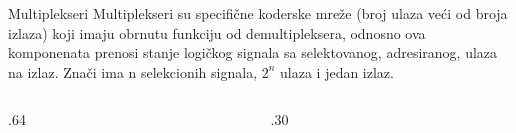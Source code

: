 \begin{frame}[label=03-s013]{Multiplekseri}
\gusttekst
Multiplekseri su specifične koderske mreže (broj ulaza veći od broja izlaza) koji imaju obrnutu funkciju od demultipleksera, odnosno ova komponenata prenosi stanje logičkog signala sa selektovanog, adresiranog, ulaza na izlaz. Znači ima n selekcionih signala, \(2^n\) ulaza i jedan izlaz.
\begingroup
\def\DEjedinica{.85cm}\def\DEdekmod{0}\def\DEcs{0}\def\DEprimer{0}
\begin{columns}[c,onlytextwidth]
\begin{column}{.64\textwidth}\centering

\end{column}
\begin{column}{.30\textwidth}\centering

\end{column}
\end{columns}
\endgroup
\end{frame}
